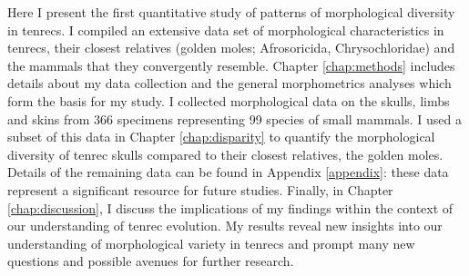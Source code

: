 

	Here I present the first quantitative study of patterns of morphological diversity in tenrecs. I compiled an extensive data set of morphological characteristics in tenrecs, their closest relatives (golden moles; Afrosoricida, Chrysochloridae) and the mammals that they convergently resemble. Chapter \ref{chap:methods} includes details about my data collection and the general morphometrics analyses which form the basis for my study. I collected morphological data on the skulls, limbs and skins from 366 specimens representing 99 species of small mammals. I used a subset of this data in Chapter \ref{chap:disparity} to quantify the morphological diversity of tenrec skulls compared to their closest relatives, the golden moles. Details of the remaining data can be found in Appendix \ref{appendix}: these data represent a significant resource for future studies. Finally, in Chapter \ref{chap:discussion}, I discuss the implications of my findings within the context of our understanding of tenrec evolution. My results reveal new insights into our understanding of morphological variety in tenrecs and prompt many new questions and possible avenues for further research.


